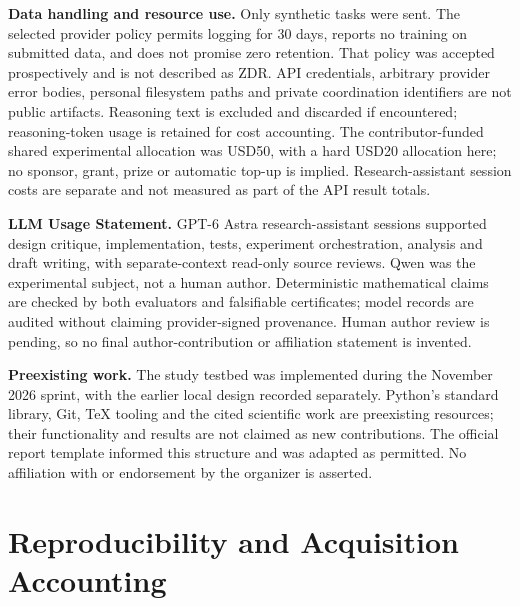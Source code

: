 \documentclass[10pt]{article}
\begin{document}
\textbf{Data handling and resource use.} Only synthetic tasks were sent. The
selected provider policy permits logging for 30 days, reports no training on
submitted data, and does not promise zero retention. That policy was accepted
prospectively and is not described as ZDR. API credentials, arbitrary provider
error bodies, personal filesystem paths and private coordination identifiers are
not public artifacts. Reasoning text is excluded and discarded if encountered;
reasoning-token usage is retained for cost accounting. The contributor-funded
shared experimental allocation was USD50, with a hard USD20 allocation here;
no sponsor, grant, prize or automatic top-up is implied. Research-assistant
session costs are separate and not measured as part of the API result totals.

\textbf{LLM Usage Statement.} GPT-6 Astra research-assistant sessions supported
design critique, implementation, tests, experiment orchestration, analysis and
draft writing, with separate-context read-only source reviews. Qwen was the
experimental subject, not a human author. Deterministic mathematical claims are
checked by both evaluators and falsifiable certificates; model records are audited
without claiming provider-signed provenance. Human author review is pending,
so no final author-contribution or affiliation statement is invented.

\textbf{Preexisting work.} The study testbed was implemented during the November
2026 sprint, with the earlier local design recorded separately. Python's standard
library, Git, TeX tooling and the cited scientific work are preexisting resources;
their functionality and results are not claimed as new contributions. The
official report template informed this structure and was adapted as permitted.
No affiliation with or endorsement by the organizer is asserted.

\section{Reproducibility and Acquisition Accounting}
\ReproductionResults
\end{document}
